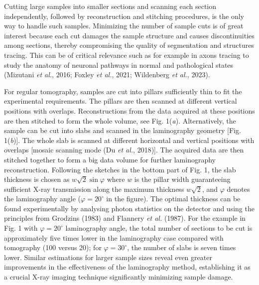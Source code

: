 \documentclass{article}
\begin{document}
Cutting large samples into smaller sections and scanning each section independently, followed by reconstruction and stitching procedures, is the only way to handle such samples. Minimizing the number of sample cuts is of great interest because each cut damages the sample structure and causes discontinuities among sections, thereby compromising the quality of segmentation and structures tracing. This can be of critical relevance such as for example in axons tracing to study the anatomy of neuronal pathways in normal and pathological states (Mizutani \emph{et al.}, 2016; Foxley \emph{et al.}, 2021; Wildenberg \emph{et al.}, 2023).

For regular tomography, samples are cut into pillars sufficiently thin to fit the experimental requirements. The pillars are then scanned at different vertical positions with overlaps. Reconstructions from the data acquired at these positions are then stitched to form the whole volume, see Fig. 1(\emph{a}). Alternatively, the sample can be cut into slabs and scanned in the laminography geometry [Fig. 1(\emph{b})]. The whole slab is scanned at different horizontal and vertical positions with overlaps [mosaic scanning mode (Du \emph{et al.}, 2018)]. The acquired data are then stitched together to form a big data volume for further laminography reconstruction. Following the sketches in the bottom part of Fig. 1, the slab thickness is chosen as $w\sqrt{2}\sin\varphi$ where $w$ is the pillar width guaranteeing sufficient X-ray transmission along the maximum thickness $w\sqrt{2}$, and $\varphi$ denotes the laminography angle ($\varphi = 20^\circ$ in the figure). The optimal thickness can be found experimentally by analysing photon statistics on the detector and using the principles from Grodzins (1983) and Flannery \emph{et al.} (1987). For the example in Fig. 1 with $\varphi = 20^\circ$ laminography angle, the total number of sections to be cut is approximately five times lower in the laminography case compared with tomography (100 versus 20); for $\varphi = 30^\circ$, the number of slabs is seven times lower. Similar estimations for larger sample sizes reveal even greater improvements in the effectiveness of the laminography method, establishing it as a crucial X-ray imaging technique significantly minimizing sample damage.
\end{document}
